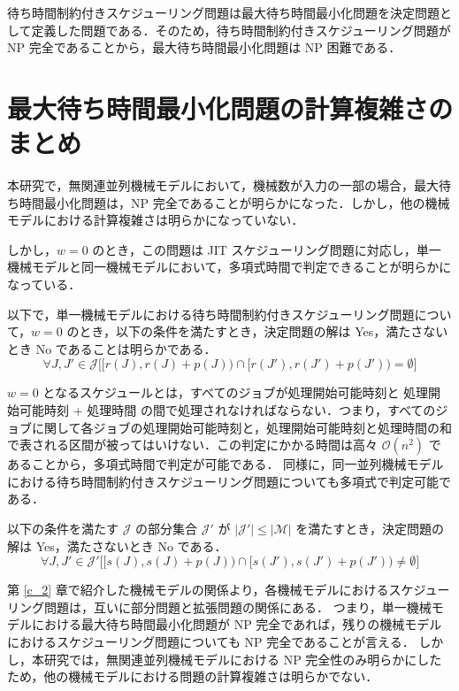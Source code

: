\documentclass[12pt]{optlab-bachelor}
\begin{document}
待ち時間制約付きスケジューリング問題は最大待ち時間最小化問題を決定問題として定義した問題である．そのため，待ち時間制約付きスケジューリング問題が NP 完全であることから，最大待ち時間最小化問題は NP 困難である．

\section{最大待ち時間最小化問題の計算複雑さのまとめ}\label{4_s_2}
本研究で，無関連並列機械モデルにおいて，機械数が入力の一部の場合，最大待ち時間最小化問題は，NP 完全であることが明らかになった．しかし，他の機械モデルにおける計算複雑さは明らかになっていない．

しかし，$w = 0$ のとき，この問題は JIT スケジューリング問題に対応し，単一機械モデルと同一機械モデルにおいて，多項式時間で判定できることが明らかになっている．

以下で，単一機械モデルにおける待ち時間制約付きスケジューリング問題について，$w = 0$ のとき，以下の条件を満たすとき，決定問題の解は Yes，満たさないとき No であることは明らかである．
\begin{displaymath}
  \forall J,J' \in \mathcal{J}\bigg[\big[r(J),r(J) + p(J)\big) \cap \big[r(J'),r(J') + p(J')\big) = \emptyset\bigg]
\end{displaymath}

$w = 0$ となるスケジュールとは，すべてのジョブが処理開始可能時刻と 処理開始可能時刻 + 処理時間 の間で処理されなければならない．つまり，すべてのジョブに関して各ジョブの処理開始可能時刻と，処理開始可能時刻と処理時間の和で表される区間が被ってはいけない．この判定にかかる時間は高々 $\mathcal{O}(n^2)$ であることから，多項式時間で判定が可能である．
同様に，同一並列機械モデルにおける待ち時間制約付きスケジューリング問題についても多項式で判定可能である．

以下の条件を満たす $\mathcal{J}$ の部分集合 $\mathcal{J}'$ が $|\mathcal{J}'| \le |\mathcal{M}|$ を満たすとき，決定問題の解は Yes，満たさないとき No である．
\begin{displaymath}
  \forall J,J' \in \mathcal{J}'\bigg[\big[s(J),s(J) + p(J)\big) \cap \big[s(J'),s(J') + p(J')\big) \neq \emptyset\bigg]
\end{displaymath}

第 \ref{c_2} 章で紹介した機械モデルの関係より，各機械モデルにおけるスケジューリング問題は，互いに部分問題と拡張問題の関係にある．
つまり，単一機械モデルにおける最大待ち時間最小化問題が NP 完全であれば，残りの機械モデルにおけるスケジューリング問題についても NP 完全であることが言える．
しかし，本研究では，無関連並列機械モデルにおける NP 完全性のみ明らかにしたため，他の機械モデルにおける問題の計算複雑さは明らかでない．
\end{document}
